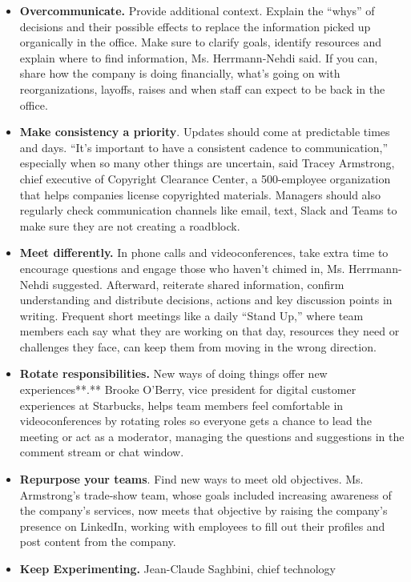 \begin{itemize}
\item
  \textbf{Overcommunicate.} Provide additional context. Explain the
  ``whys'' of decisions and their possible effects to replace the
  information picked up organically in the office. Make sure to clarify
  goals, identify resources and explain where to find information, Ms.
  Herrmann-Nehdi said. If you can, share how the company is doing
  financially, what's going on with reorganizations, layoffs, raises and
  when staff can expect to be back in the office.
\item
  \textbf{Make consistency a priority}. Updates should come at
  predictable times and days. ``It's important to have a consistent
  cadence to communication,'' especially when so many other things are
  uncertain, said Tracey Armstrong, chief executive of Copyright
  Clearance Center, a 500-employee organization that helps companies
  license copyrighted materials. Managers should also regularly check
  communication channels like email, text, Slack and Teams to make sure
  they are not creating a roadblock.
\item
  \textbf{Meet differently.} In phone calls and videoconferences, take
  extra time to encourage questions and engage those who haven't chimed
  in, Ms. Herrmann-Nehdi suggested. Afterward, reiterate shared
  information, confirm understanding and distribute decisions, actions
  and key discussion points in writing. Frequent short meetings like a
  daily ``Stand Up,'' where team members each say what they are working
  on that day, resources they need or challenges they face, can keep
  them from moving in the wrong direction.
\item
  \textbf{Rotate responsibilities.} New ways of doing things offer new
  experiences**.** Brooke O'Berry, vice president for digital customer
  experiences at Starbucks, helps team members feel comfortable in
  videoconferences by rotating roles so everyone gets a chance to lead
  the meeting or act as a moderator, managing the questions and
  suggestions in the comment stream or chat window.
\item
  \textbf{Repurpose your teams}. Find new ways to meet old objectives.
  Ms. Armstrong's trade-show team, whose goals included increasing
  awareness of the company's services, now meets that objective by
  raising the company's presence on LinkedIn, working with employees to
  fill out their profiles and post content from the company.
\item
  \textbf{Keep Experimenting.} Jean-Claude Saghbini, chief technology

\end{itemize}
